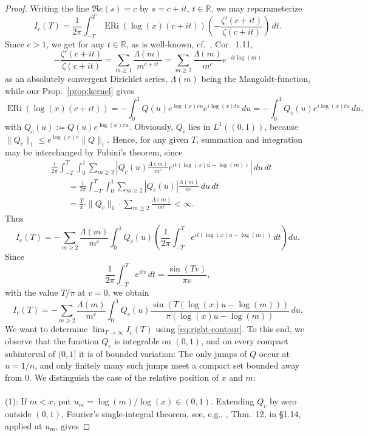 \documentclass[a4paper,10pt]{amsart}
\DeclareMathOperator{\ERi}{ERi}
\theoremstyle{definition}
\numberwithin{equation}{section}
\def\R{\mathbb R}
\begin{document}
\begin{proof}
Writing the line $\Re e(s)=c$ by $s=c+it$, $t\in\R$, we may reparameterize
$$
I_c(T) = \frac1{2\pi}\int_{-T}^{T} \ERi(\log(x)(c+it)) \left(-\frac{\zeta'(c+it)}{\zeta(c+it)}\right)\,dt.
$$
Since $c>1$, we get for any $t\in\R$, as is well-known, cf.\ \cite{MontgomeryVaughan}, Cor.\ 1.11,
$$
-\frac{\zeta'(c+it)}{\zeta(c+it)} = \sum_{m\ge1}\frac{\Lambda(m)}{m^{c+it}}=\sum_{m\ge2}\frac{\Lambda(m)}{m^c}e^{-it\log(m)}
$$
as an absolutely convergent Dirichlet series, $\Lambda(m)$ being the Mangoldt-function, while our Prop.\ \ref{prop:kernel} gives
$$\ERi(\log(x)(c+it)) = -\int_0^1 Q(u)e^{\log(x)cu}e^{i\log(x)tu}\,du = -\int_0^1 Q_c(u)e^{i\log(x)tu}\,du,$$
with $Q_c(u):=Q(u)e^{\log(x)cu}$. Obviously, $Q_c$ lies in $L^1((0,1))$, because $\|Q_c\|_1\le e^{\log(x)c}\|Q\|_1$. Hence, for any given $T$, summation and integration may be interchanged by Fubini's theorem, since
$$
\begin{aligned}
&\frac1{2\pi}\int_{-T}^{T}\int_0^1 \sum_{m\ge2} \left| Q_c(u)\frac{\Lambda(m)}{m^c} e^{it(\log(x)u-\log(m))} \right|\,du\,dt\\
&\qquad=\frac1{2\pi}\int_{-T}^{T}\int_0^1 \sum_{m\ge2} \left| Q_c(u)\right|\frac{\Lambda(m)}{m^c} \,du\,dt\\
&\qquad= \frac{T}{\pi}\cdot \|Q_c\|_{1}\cdot \sum_{m\ge2}\frac{\Lambda(m)}{m^c}<\infty.
\end{aligned}
$$
Thus
$$
I_c(T)=-\sum_{m\ge2}\frac{\Lambda(m)}{m^c}\int_0^1Q_c(u)\left(\frac1{2\pi}\int_{-T}^{T}e^{it(\log(x)u-\log(m))}\,dt\right)du.
$$
Since
$$
\frac1{2\pi}\int_{-T}^{T}e^{itv}\,dt =\frac{\sin(Tv)}{\pi v},
$$
with the value $T/\pi$ at $v=0$, we obtain
\begin{equation}\label{eq:right-contour}
I_c(T)=-\sum_{m\ge2}\frac{\Lambda(m)}{m^c}\int_0^1Q_c(u)\frac{\sin(T(\log(x)u-\log(m)))}{\pi(\log(x)u-\log(m))}\,du.
\end{equation}
We want to determine $\lim_{T\to\infty}I_c(T)$ using \eqref{eq:right-contour}. To this end, we observe that the function $Q_c$ is integrable on $(0,1)$, and on every compact subinterval of $(0,1]$ it is of bounded variation: The only jumps of $Q$ occur at $u=1/n$, and only finitely many such jumps meet a compact set bounded away from $0$. We distinguish the case of the relative position of $x$ and $m$:\\\\
(1): If $m<x$, put $u_m=\log(m)/\log(x)\in(0,1)$. Extending $Q_c$ by zero outside $(0,1)$, Fourier's single-integral theorem, see, e.g., \cite{TitchmarshFourier}, Thm.\ 12, in \S1.14, applied at $u_m$, gives 

\end{proof}
\end{document}
